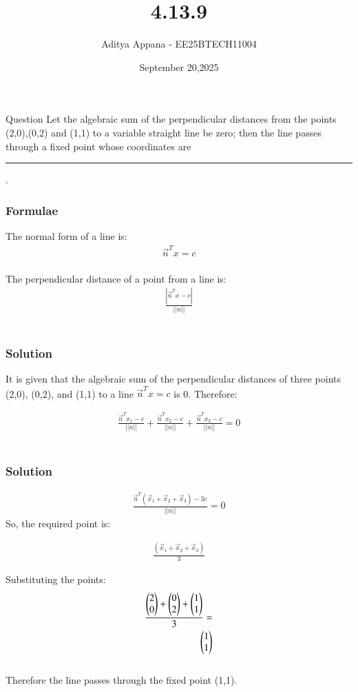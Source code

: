 \documentclass{beamer}
\title %
{4.13.9}
\date{September 20,2025}
\author %
{Aditya Appana - EE25BTECH11004}
\begin{document}
\frame{\titlepage}
\begin{frame}{Question}
Let the algebraic sum of the perpendicular distances from the points (2,0),(0,2) and
(1,1) to a variable straight line be zero; then the line passes through a fixed point
whose coordinates are \rule{1.5cm}{0.15mm}.
\end{frame}



\begin{frame}[fragile]
    \frametitle{Formulae}
The normal form of a line is:
\begin{align}
\vec{n}^Tx = c
\end{align}\\
The perpendicular distance of a point from a line is:
\begin{align}
\frac{|\vec{n}^Tx - c|}{||n||}
\end{align}\\

\end{frame}

\begin{frame}[fragile]
    \frametitle{Solution}
It is given that the algebraic sum of the perpendicular distances of three points (2,0), (0,2), and (1,1) to a line $\vec{n}^Tx = c$ is 0. Therefore:

\begin{align}
\frac{\vec{n}^Tx_1 - c}{||n||} + \frac{\vec{n}^Tx_2 - c}{||n||} + \frac{\vec{n}^Tx_3 - c}{||n||} = 0
\end{align}\\
\end{frame}

\begin{frame}[fragile]
\frametitle{Solution}
\begin{align}
\frac{\vec{n}^T(\vec{x}_1 +\vec{x}_2+ \vec{x}_3)- 3c}{||n||} = 0
\end{align}
So, the required point is:

\begin{align}
\frac{(\vec{x}_1 +\vec{x}_2+ \vec{x}_3)}{3}
\end{align}

Substituting the points:
\begin{align}
\frac{\begin{pmatrix}2\\0\end{pmatrix} + \begin{pmatrix}0\\2\end{pmatrix} + \begin{pmatrix}1\\1\end{pmatrix} }{3} =\\
\begin{pmatrix}1\\1\end{pmatrix}
\end{align}\\
Therefore the line passes through the fixed point (1,1).
\end{frame}
\end{document}
